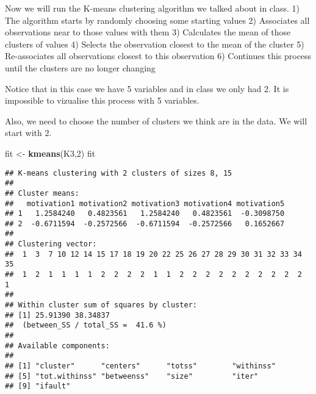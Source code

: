 \documentclass[]{article}
\newenvironment{Shaded}{\begin{snugshade}}{\end{snugshade}}
\newcommand{\CommentTok}[1]{\textcolor[rgb]{0.56,0.35,0.01}{\textit{#1}}}
\newcommand{\DecValTok}[1]{\textcolor[rgb]{0.00,0.00,0.81}{#1}}
\newcommand{\KeywordTok}[1]{\textcolor[rgb]{0.13,0.29,0.53}{\textbf{#1}}}
\newcommand{\NormalTok}[1]{#1}
\newcommand{\OperatorTok}[1]{\textcolor[rgb]{0.81,0.36,0.00}{\textbf{#1}}}
\newcommand{\StringTok}[1]{\textcolor[rgb]{0.31,0.60,0.02}{#1}}
\begin{document}
Now we will run the K-means clustering algorithm we talked about in
class. 1) The algorithm starts by randomly choosing some starting values
2) Associates all observations near to those values with them 3)
Calculates the mean of those clusters of values 4) Selects the
observation closest to the mean of the cluster 5) Re-associates all
observations closest to this observation 6) Continues this process until
the clusters are no longer changing

Notice that in this case we have 5 variables and in class we only had 2.
It is impossible to vizualise this process with 5 variables.

Also, we need to choose the number of clusters we think are in the data.
We will start with 2.

\begin{Shaded}
\begin{Highlighting}[]
\NormalTok{fit <-}\StringTok{ }\KeywordTok{kmeans}\NormalTok{(K3,}\DecValTok{2}\NormalTok{)}
\NormalTok{fit}
\end{Highlighting}
\end{Shaded}

\begin{verbatim}
## K-means clustering with 2 clusters of sizes 8, 15
## 
## Cluster means:
##   motivation1 motivation2 motivation3 motivation4 motivation5
## 1   1.2584240   0.4823561   1.2584240   0.4823561  -0.3098750
## 2  -0.6711594  -0.2572566  -0.6711594  -0.2572566   0.1652667
## 
## Clustering vector:
##  1  3  7 10 12 14 15 17 18 19 20 22 25 26 27 28 29 30 31 32 33 34 35 
##  1  2  1  1  1  1  2  2  2  2  1  1  2  2  2  2  2  2  2  2  2  2  1 
## 
## Within cluster sum of squares by cluster:
## [1] 25.91390 38.34837
##  (between_SS / total_SS =  41.6 %)
## 
## Available components:
## 
## [1] "cluster"      "centers"      "totss"        "withinss"    
## [5] "tot.withinss" "betweenss"    "size"         "iter"        
## [9] "ifault"
\end{verbatim}

\begin{Shaded}
\end{Shaded}
\end{document}
